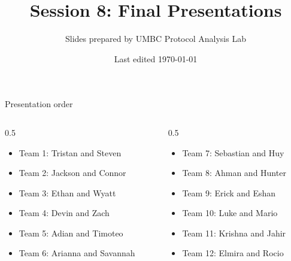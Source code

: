 \documentclass[red]{beamer}
\begin{document}

\title{Session 8: Final Presentations}
\author{Slides prepared by UMBC Protocol Analysis Lab}
\date{Last edited \today}
\begin{frame}
\maketitle
\end{frame}

\begin{frame}
\begin{center}
{\huge Presentation order}
\end{center}
\begin{columns}
\begin{column}{0.5\textwidth}
\begin{itemize}
\item Team 1: Tristan and Steven
\item Team 2: Jackson and Connor
\item Team 3: Ethan and Wyatt
\item Team 4: Devin and Zach
\item Team 5: Adian and Timoteo
\item Team 6: Arianna and Savannah
\end{itemize}
\end{column}

\begin{column}{0.5\textwidth}
\begin{itemize}
\item Team 7: Sebastian and Huy
\item Team 8: Ahman and Hunter
\item Team 9: Erick and Eshan
\item Team 10: Luke and Mario
\item Team 11: Krishna and Jahir
\item Team 12: Elmira and Rocio
\end{itemize}
\end{column}
\end{columns}

\end{frame}
\end{document}
